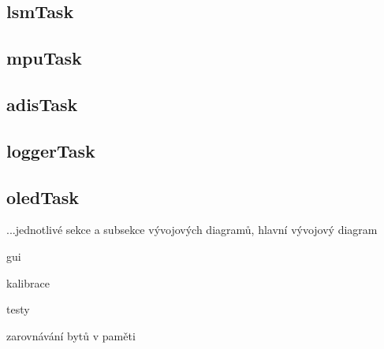\subsection{lsmTask}
\subsection{mpuTask}
\subsection{adisTask}
\subsection{loggerTask}
\subsection{oledTask}

...jednotlivé sekce a subsekce vývojových diagramů, hlavní vývojový diagram

gui

kalibrace

testy

zarovnávání bytů v paměti



